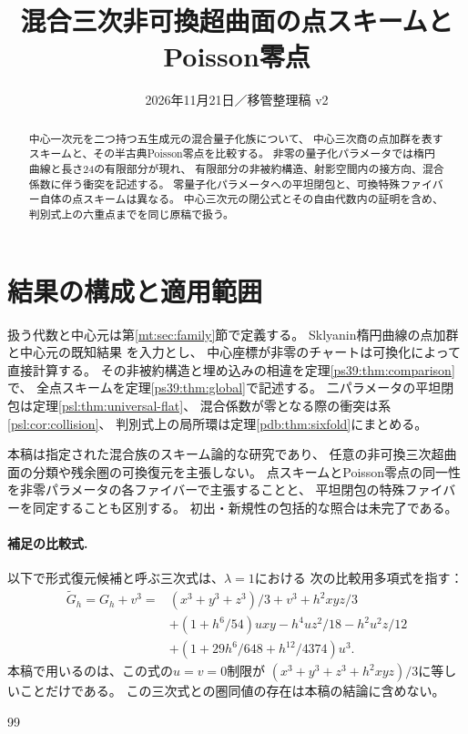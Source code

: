 
\title{混合三次非可換超曲面の点スキームとPoisson零点}
\author{}
\date{2026年11月21日／移管整理稿 v2}

\maketitle
\begin{abstract}
中心一次元を二つ持つ五生成元の混合量子化族について、
中心三次商の点加群を表すスキームと、その半古典Poisson零点を比較する。
非零の量子化パラメータでは楕円曲線と長さ24の有限部分が現れ、
有限部分の非被約構造、射影空間内の接方向、混合係数に伴う衝突を記述する。
零量子化パラメータへの平坦閉包と、可換特殊ファイバー自体の点スキームは異なる。
中心三次元の閉公式とその自由代数内の証明を含め、
判別式上の六重点までを同じ原稿で扱う。
\end{abstract}

\section*{結果の構成と適用範囲}
扱う代数と中心元は第\ref{mt:sec:family}節で定義する。
Sklyanin楕円曲線の点加群と中心元の既知結果
\cite{PSPSmithTate,PSPDeLaet}を入力とし、
中心座標が非零のチャートは可換化によって直接計算する。
その非被約構造と埋め込みの相違を定理\ref{ps39:thm:comparison}で、
全点スキームを定理\ref{ps39:thm:global}で記述する。
二パラメータの平坦閉包は定理\ref{psl:thm:universal-flat}、
混合係数が零となる際の衝突は系\ref{psl:cor:collision}、
判別式上の局所環は定理\ref{pdb:thm:sixfold}にまとめる。

本稿は指定された混合族のスキーム論的な研究であり、
任意の非可換三次超曲面の分類や残余圏の可換復元を主張しない。
点スキームとPoisson零点の同一性を非零パラメータの各ファイバーで主張することと、
平坦閉包の特殊ファイバーを同定することも区別する。
初出・新規性の包括的な照合は未完了である。



\paragraph{補足の比較式.}
以下で形式復元候補と呼ぶ三次式は、$\lambda=1$における
次の比較用多項式を指す：
\begin{equation}\label{ps:comparison-cubic}
\begin{split}
 \widetilde G_h=G_h+v^3={}&(x^3+y^3+z^3)/3+v^3+h^2xyz/3\\
 &+(1+h^6/54)uxy-h^4uz^2/18-h^2u^2z/12\\
 &+(1+29h^6/648+h^{12}/4374)u^3.
\end{split}
\end{equation}
本稿で用いるのは、この式の$u=v=0$制限が
$(x^3+y^3+z^3+h^2xyz)/3$に等しいことだけである。
この三次式との圏同値の存在は本稿の結論に含めない。





\begin{thebibliography}{99}

\end{thebibliography}


